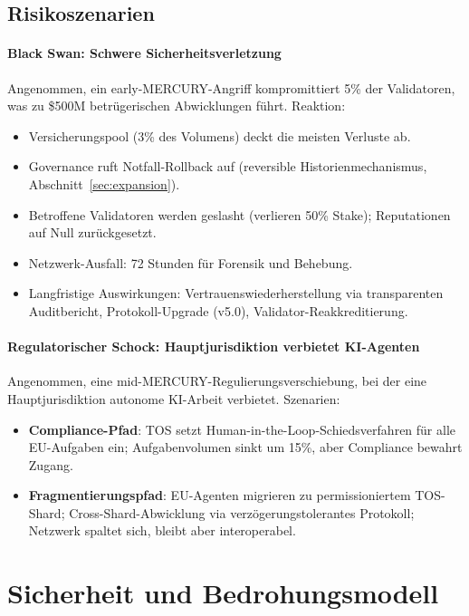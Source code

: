 \documentclass[11pt]{article}
\begin{document}
\subsection{Risikoszenarien}
\paragraph{Black Swan: Schwere Sicherheitsverletzung}
Angenommen, ein early-MERCURY-Angriff kompromittiert 5\% der Validatoren, was zu \$500M betrügerischen Abwicklungen führt. Reaktion:
\begin{itemize}[noitemsep]
  \item Versicherungspool (3\% des Volumens) deckt die meisten Verluste ab.
  \item Governance ruft Notfall-Rollback auf (reversible Historienmechanismus, Abschnitt~\ref{sec:expansion}).
  \item Betroffene Validatoren werden geslasht (verlieren 50\% Stake); Reputationen auf Null zurückgesetzt.
  \item Netzwerk-Ausfall: 72 Stunden für Forensik und Behebung.
  \item Langfristige Auswirkungen: Vertrauenswiederherstellung via transparenten Auditbericht, Protokoll-Upgrade (v5.0), Validator-Reakkreditierung.
\end{itemize}

\paragraph{Regulatorischer Schock: Hauptjurisdiktion verbietet KI-Agenten}
Angenommen, eine mid-MERCURY-Regulierungsverschiebung, bei der eine Hauptjurisdiktion autonome KI-Arbeit verbietet. Szenarien:
\begin{itemize}[noitemsep]
  \item \textbf{Compliance-Pfad}: TOS setzt Human-in-the-Loop-Schiedsverfahren für alle EU-Aufgaben ein; Aufgabenvolumen sinkt um 15\%, aber Compliance bewahrt Zugang.
  \item \textbf{Fragmentierungspfad}: EU-Agenten migrieren zu permissioniertem TOS-Shard; Cross-Shard-Abwicklung via verzögerungstolerantes Protokoll; Netzwerk spaltet sich, bleibt aber interoperabel.
\end{itemize}

\section{Sicherheit und Bedrohungsmodell}
\label{sec:security}
\end{document}
